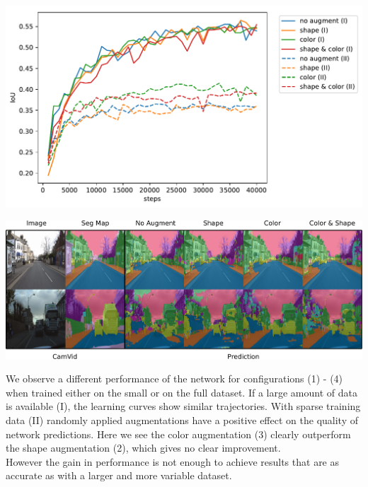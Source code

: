 \documentclass[a0paper,portrait]{baposter}
\begin{document}
\begin{poster}
{\begin{minipage}[t]{0.49\textwidth}\centering
    \vspace{0pt}
    \includegraphics[width=\linewidth, keepaspectratio,trim={0 10px 0 0}, clip]{result.pdf}
\end{minipage}\hfill
\begin{minipage}[t]{0.49\textwidth}\centering
    \vspace{4pt}
    \includegraphics[width=\linewidth]{prediction.pdf}
\end{minipage}
\vspace{.5\baselineskip}

We observe a different performance of the network for configurations (1) - (4) when trained either on the small or on the full dataset. If a large amount of data is available (I), the learning curves show similar trajectories. With sparse training data (II) randomly applied augmentations have a positive effect on the quality of network predictions. Here we see the color augmentation (3) clearly outperform the shape augmentation (2), which gives no clear improvement.\\
However the gain in performance is not enough to achieve results that are as accurate as with a larger and more variable dataset.
\vspace{10px}
}



\end{poster}
\end{document}
